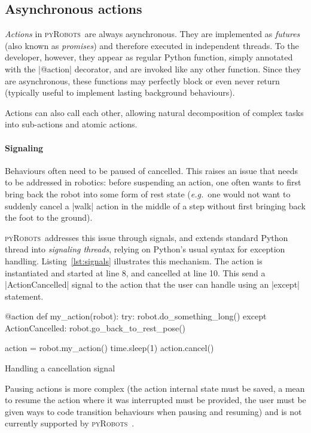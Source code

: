 \documentclass[a4paper, 10pt, conference]{ieeeconf}      %
\newcommand{\eg}{{\textit{e.g.\ }}}
\newcommand{\pyRobots}{\textsc{pyRobots}\ }
\begin{document}
\subsection{Asynchronous actions}

\emph{Actions} in \pyRobots are always asynchronous. They are implemented as
\emph{futures} (also known as \emph{promises}) and therefore executed in
independent threads. To the developer, however, they appear as regular Python
function, simply annotated with the \python|@action| decorator, and are invoked
like any other function.  Since they are asynchronous, these functions may
perfectly block or even never return (typically useful to implement lasting
background behaviours).

Actions can also call each other, allowing natural decomposition of complex
tasks into sub-actions and atomic actions.

\paragraph{Signaling} Behaviours often need to be paused of cancelled.  This
raises an issue that needs to be addressed in robotics: before suspending an
action, one often wants to first bring back the robot into some form of rest
state (\eg one would not want to suddenly cancel a \python|walk| action in the
middle of a step without first bringing back the foot to the ground).

\pyRobots addresses this issue through signals, and extends standard
Python thread into \emph{signaling threads}, relying on Python's usual syntax
for exception handling. Listing~\ref{lst:signals}
illustrates this mechanism. The action is instantiated and started at line 8,
and cancelled at line 10. This send a \python|ActionCancelled| signal to the
action that the user can handle using an \python|except| statement.

\begin{listing}[H]
\begin{pythoncode}
    @action
    def my_action(robot):
      try:
        robot.do_something_long()
      except ActionCancelled:
        robot.go_back_to_rest_pose()

    action = robot.my_action()
    time.sleep(1)
    action.cancel()
\end{pythoncode}
\caption{Handling a cancellation signal}
\label{lst:signals}
\end{listing}

Pausing actions is more complex (the action internal state must be saved, a mean
to resume the action where it was interrupted must be provided, the user must be
given ways to code transition behaviours when pausing and resuming) and is not
currently supported by \pyRobots.
\end{document}
